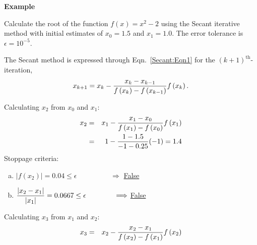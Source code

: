    \begin{MyExample}{\begin{center}{\bf Example}\end{center}}
     \begin{example}\label{Section:RootFinderMethods:Example:Roots:Secant} 
        Calculate the root of the function $f(x) = x^{2}-2$ using the Secant iterative method with initial estimates of $x_{0}=1.5$ and $x_{1}=1.0$. The error tolerance is $\epsilon=10^{-5}$.
     \end{example}

        The Secant method is expressed through Eqn.~\ref{Secant:Eqn1} for the $(k+1)^{\text{th}}$-iteration,
          \begin{displaymath}
            x_{k+1} = x_{k} - \displaystyle\frac{ x_{k} - x_{k-1} }{f\left(x_{k}\right) - f\left(x_{k-1}\right)} f\left(x_{k}\right).
         \end{displaymath}
         \begin{list}{{\bf Iteration } (k=):~}{}
            \item Calculating $x_{2}$ from $x_{0}$ and $x_{1}$:
                  \begin{eqnarray}
                      x_{2} &=& x_{1} - \displaystyle\frac{ x_{1} - x_{0} }{f\left(x_{1}\right) - f\left(x_{0}\right)} f\left(x_{1}\right) \nonumber \\
                           &=& 1 - \displaystyle\frac{1 - 1.5}{-1-0.25}  (-1) = 1.4 \nonumber 
                  \end{eqnarray}
                  Stoppage criteria:
                    \begin{enumerate}[(a)]
                         \item $\left|f\left(x_{2}\right)\right| = 0.04 \leq \epsilon \hspace{2cm} \Longrightarrow$ \underline{False}
                         \item $\displaystyle\frac{\left|x_{2}-x_{1}\right|}{\left|x_{1}\right|} = 0.0667 \leq \epsilon \hspace{1.4cm} \Longrightarrow$ \underline{False}
                    \end{enumerate}
            \item Calculating $x_{3}$ from $x_{1}$ and $x_{2}$:
                  \begin{eqnarray}
                      x_{3} &=& x_{2} - \frc{ x_{2} - x_{1} }{f\left(x_{2}\right) - f\left(x_{1}\right)} f\left(x_{2}\right) \nonumber \\

\end{eqnarray}
\end{list}
\end{MyExample}
